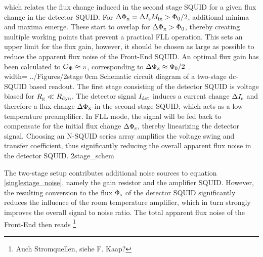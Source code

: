 
which relates the flux change induced in the second stage SQUID for a given flux change in the detector SQUID. For $\Delta\Phi_{\rm x}=\Delta I_{\rm s}M_{\rm ix}>\Phi_0/2$, additional minima and maxima emerge. These start to overlap for $\Delta\Phi_{\rm x}>\Phi_0$, thereby creating multiple working points that prevent a practical FLL operation. This sets an upper limit for the flux gain, however, it should be chosen as large as possible to reduce the apparent flux noise of the Front-End SQUID. An optimal flux gain has been calculated to $G_{\rm \Phi}\approx\pi$, corresponding to $\Delta\Phi_{\rm x}\approx\Phi_0/2$ \cite{Drung1996a}. \\

{width=\textwidth}
{../Figures/2stage}
{0cm}
{Schematic circuit diagram of a two-stage dc-SQUID based readout. The first stage consisting of the detector SQUID is voltage biased for $R_{\rm g}\ll R_{\rm dyn}$. The detector signal $I_{\rm det}$ induces a current change $\Delta I_{\rm s}$ and therefore a flux change $\Delta\Phi_{\rm x}$ in the second stage SQUID, which acts as a low temperature preamplifier. In FLL mode, the signal will be fed back to compensate for the initial flux change $\Delta\Phi_{\rm s}$, thereby linearizing the detector signal. Choosing an N-SQUID series array amplifies the voltage swing and transfer coefficient, thus significantly reducing the overall apparent flux noise in the detector SQUID.} 
{2stage_schem}

The two-stage setup contributes additional noise sources to equation \ref{singlestage_noise}, namely the gain resistor and the amplifier SQUID. However, the resulting conversion to the flux $\Phi_{\rm s}$ of the detector SQUID significantly reduces the influence of the room temperature amplifier, which in turn strongly improves the overall signal to noise ratio. The total apparent flux noise of the Front-End then reads \cite{Drung1996a}\footnote{Auch Stromquellen, siehe F. Kaap?}


